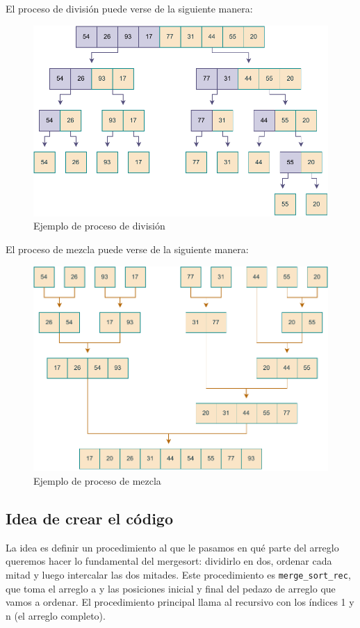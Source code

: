 El proceso de división puede verse de la siguiente manera:

\newpage
\begin{figure}[h]
\centering
\includegraphics[scale=0.88]{./estáticos/mergediv.pdf}
\caption{Ejemplo de proceso de división}
\end{figure}

El proceso de mezcla puede verse de la siguiente manera:

\begin{figure}[h]
\centering
\includegraphics[scale=0.88]{./estáticos/mergemezcla.pdf}
\caption{Ejemplo de proceso de mezcla}
\end{figure}

\subsection{Idea de crear el código}
La idea es definir un procedimiento al que le pasamos en qué parte del arreglo queremos hacer lo fundamental del mergesort: dividirlo en dos, ordenar cada mitad y luego intercalar las dos mitades. Este procedimiento es \texttt{merge\_sort\_rec}, que toma el arreglo a y las posiciones inicial y final del pedazo de arreglo que vamos a ordenar. El procedimiento principal llama al recursivo con los índices 1 y n (el arreglo completo).

